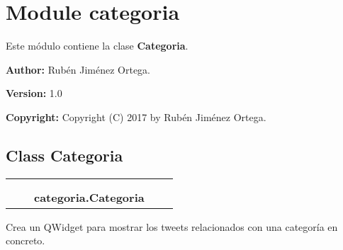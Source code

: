 %
%
%


\section{Module categoria}

    \label{categoria}
Este módulo contiene la clase \textbf{Categoria}.

\textbf{Author:} Rubén Jiménez Ortega.



\textbf{Version:} 1.0



\textbf{Copyright:} Copyright (C) 2017 by Rubén Jiménez Ortega.





\subsection{Class Categoria}

    \label{categoria:Categoria}
\begin{tabular}{cccccc}
\multicolumn{2}{r}{\settowidth{\BCL}{??-2}\multirow{2}{\BCL}{??-2}}
&&
  \\\cline{3-3}
  &&\multicolumn{1}{c|}{}
&&
  \\
&&\multicolumn{2}{l}{\textbf{categoria.Categoria}}
\end{tabular}

Crea un QWidget para mostrar los tweets relacionados con una categoría en 
concreto.



